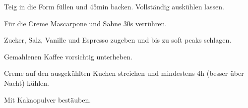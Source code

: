 \begin{recipe}
{    \step%
    Teig in die Form füllen und 45min backen. Vollständig auskühlen lassen.
    
    \step%
    Für die Creme Mascarpone und Sahne 30s verrühren.
    
    \step%
    Zucker, Salz, Vanille und Espresso zugeben und bis zu soft peaks schlagen.
    
    \step%
    Gemahlenen Kaffee vorsichtig unterheben.
    
    \step%
    Creme auf den ausgekühlten Kuchen streichen und mindestens 4h (besser über Nacht) kühlen.
    
    \step%
    Mit Kakaopulver bestäuben.
}


\end{recipe}